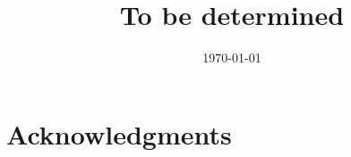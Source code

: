 \documentclass[a4paper,10pt,oneside, fleqn]{article}
\title{To be determined}
\date{\today}
\begin{document}
\maketitle

\pagestyle{fancy}               	%

\vspace*{\fill}
\begin{abstract}

\end{abstract}
\vspace*{\fill}
\newpage

\tableofcontents
\newpage




%


\section{Acknowledgments}


\newpage 

\appendix
\section{} 

\newpage


\end{document}
